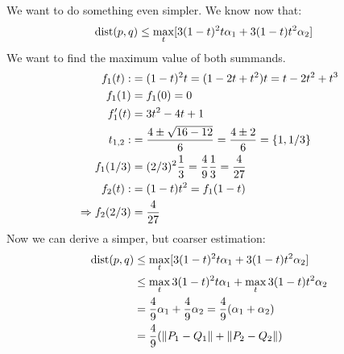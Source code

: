 We want to do something even simpler.
We know now that:
%
\begin{align*}
\mathrm{dist}(p,q) &\leq \max_t [ 3(1-t)^2 t \alpha_1 + 3 (1-t) t^2 \alpha_2 ]
\end{align*}
%
We want to find the maximum value of both summands.
%
\begin{align*}
f_1(t) :&= (1-t)^2 t = (1-2t+t^2)t = t - 2t^2 + t^3 \\
f_1(1) &= f_1(0) = 0 \\
f_1'(t) &= 3t^2 -4t +1 \\
t_{1,2} :&= \frac{4 \pm \sqrt{16-12}}{6} = \frac {4 \pm 2}6 = \{1, 1/3\} \\
f_1(1/3) &= (2/3)^2 \frac 13 = \frac 49 \frac 13 = \frac{4}{27} \\
f_2(t) :&= (1-t)t^2 = f_1(1-t) \\
\Rightarrow f_2(2/3) &= \frac 4{27}
\end{align*}
%
Now we can derive a simper, but coarser estimation:
%
\begin{align*}
\mathrm{dist}(p,q) &\leq \max_t  [ 3(1-t)^2 t \alpha_1 + 3 (1-t) t^2 \alpha_2 ] \\
&\leq \max_t 3(1-t)^2 t \alpha_1 + \max_t 3 (1-t) t^2 \alpha_2 \\
&= \frac 49 \alpha_1 + \frac 49 \alpha_2 = \frac 49 (\alpha_1 + \alpha_2) \\
&= \frac 49 (\|P_1-Q_1\| + \|P_2-Q_2\|)
\end{align*}


